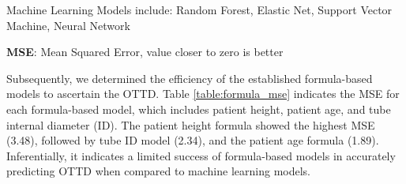 \documentclass[11pt]{article}
\begin{document}
\begin{table}[h]
\caption{Mean Squared Error for each Machine Learning Model}
\label{table:ml_mse}
\begin{threeparttable}
\renewcommand{\TPTminimum}{\linewidth}
\begin{tablenotes}
\footnotesize
\item Machine Learning Models include: Random Forest, Elastic Net, Support Vector Machine, Neural Network
\item \textbf{MSE}: Mean Squared Error, value closer to zero is better
\end{tablenotes}
\end{threeparttable}
\end{table}


Subsequently, we determined the efficiency of the established formula-based models to ascertain the OTTD. Table {}\ref{table:formula_mse} indicates the MSE for each formula-based model, which includes patient height, patient age, and tube internal diameter (ID). The patient height formula showed the highest MSE (3.48), followed by tube ID model (2.34), and the patient age formula (1.89). Inferentially, it indicates a limited success of formula-based models in accurately predicting OTTD when compared to machine learning models.
\end{document}
